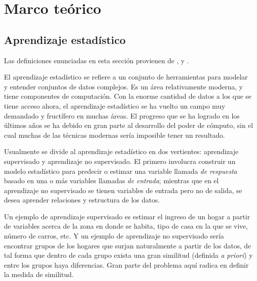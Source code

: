 
\chapter{Marco teórico}
\label{ch:marco_teorico}


\section{Aprendizaje estadístico}

Las definiciones enunciadas en esta sección provienen de \cite{christopher2006pattern}, \cite{friedman2001elements} y \cite{james2013introduction}.

El aprendizaje estadístico se refiere a un conjunto de herramientas para modelar y entender conjuntos de datos complejos. Es un área relativamente moderna, y tiene componentes de computación. Con la enorme cantidad de datos a los que se tiene acceso ahora, el aprendizaje estadístico se ha vuelto un campo muy demandado y fructífero en muchas áreas. El progreso que se ha logrado en los últimos años se ha debido en gran parte al desarrollo del poder de cómputo, sin el cual muchas de las técnicas modernas sería imposible tener un resultado.

Usualmente se divide al aprendizaje estadístico en dos vertientes: aprendizaje supervisado y aprendizaje no supervisado. El primero involucra construir un modelo estadístico para predecir o estimar una variable llamada \textit{de respuesta} basado en una o más variables llamadas \textit{de entrada}; mientras que en el aprendizaje no supervisado se tienen variables de entrada pero no de salida, se desea aprender relaciones y estructura de los datos.

Un ejemplo de aprendizaje supervisado es estimar el ingreso de un hogar a partir de variables acerca de la zona en donde se habita, tipo de casa en la que se vive, número de carros, etc. Y un ejemplo de aprendizaje no supervisado sería encontrar grupos de los hogares que surjan naturalmente a partir de los datos, de tal forma que dentro de cada grupo exista una gran similitud (definida \textit{a priori}) y entre los grupos haya diferencias. Gran parte del problema aquí radica en definir la medida de similitud.

